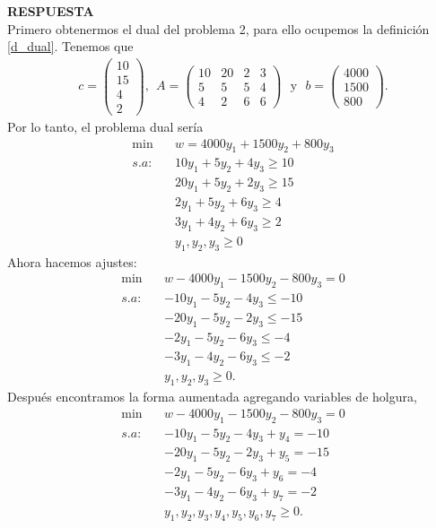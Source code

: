 \documentclass[11pt,letterpaper]{article}
\newcommand{\res}{\textbf{RESPUESTA}\\}
\begin{document}
\begin{enumerate}
\res Primero obtenermos el dual del problema 2, para ello ocupemos la definición \ref{d_dual}. Tenemos que 
\begin{align*}
c=\begin{pmatrix}
10 \\ 15\\ 4 \\2
\end{pmatrix} , \ \ A=\begin{pmatrix}
10 & 20 & 2 & 3 \\
5 & 5 & 5 & 4\\
4 & 2 & 6 & 6
\end{pmatrix} \ \ \ \text{y} \ \ \ b=\begin{pmatrix}
4000\\
1500\\
800
\end{pmatrix}.
\end{align*}
Por lo tanto, el problema dual sería
\begin{align*}
\min \ \ \ \ & w=4000y_1+1500y_2+800y_3\\
s.a:\ \ \ \ & 10y_1+5y_2+4y_3 \geq 10\\
	 & 20y_1+5y_2+2y_3 \geq 15\\
	 & 	2y_1+5y_2+6y_3 \geq 4\\
	 & 3y_1+4y_2+6y_3 \geq 2\\
	 &y_1,y_2, y_3 \geq 0
\end{align*}
Ahora hacemos ajustes:
\begin{align*}
\min \ \ \ \ & w-4000y_1-1500y_2-800y_3=0\\
s.a:\ \ \ \ & -10y_1-5y_2-4y_3 \leq -10\\
	 & -20y_1-5y_2-2y_3 \leq -15\\
	 & 	-2y_1-5y_2-6y_3 \leq -4\\
	 & -3y_1-4y_2-6y_3 \leq -2\\
	 &y_1,y_2, y_3 \geq 0.
\end{align*}
Después encontramos la forma aumentada agregando variables de holgura,
\begin{align*}
\min \ \ \ \ & w-4000y_1-1500y_2-800y_3=0\\
s.a:\ \ \ \ & -10y_1-5y_2-4y_3+y_4 =-10\\
	 & -20y_1-5y_2-2y_3+y_5 =-15\\
	 & 	-2y_1-5y_2-6y_3+y_6 = -4\\
	 & -3y_1-4y_2-6y_3 +y_7= -2\\
	 &y_1,y_2, y_3,y_4,y_5,y_6,y_7 \geq 0.
\end{align*}

\end{enumerate}
\end{document}
